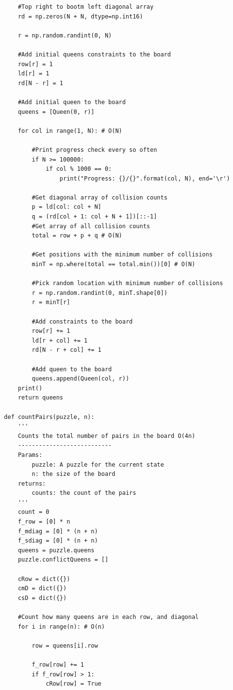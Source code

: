 \documentclass{article}
\begin{document}
\begin{verbatim}   
      #Top right to bootm left diagonal array
      rd = np.zeros(N + N, dtype=np.int16)

      r = np.random.randint(0, N)
   
      #Add initial queens constraints to the board
      row[r] = 1
      ld[r] = 1
      rd[N - r] = 1
  
      #Add initial queen to the board
      queens = [Queen(0, r)]
  
      for col in range(1, N): # O(N)
  
          #Print progress check every so often
          if N >= 100000:
              if col % 1000 == 0:
                  print("Progress: {}/{}".format(col, N), end='\r') 
  
          #Get diagonal array of collision counts
          p = ld[col: col + N]
          q = (rd[col + 1: col + N + 1])[::-1]
          #Get array of all collision counts
          total = row + p + q # O(N)
  
          #Get positions with the minimum number of collisions
          minT = np.where(total == total.min())[0] # O(N)
  
          #Pick random location with minimum number of collisions
          r = np.random.randint(0, minT.shape[0])
          r = minT[r]
  
          #Add constraints to the board
          row[r] += 1
          ld[r + col] += 1
          rd[N - r + col] += 1
  
          #Add queen to the board
          queens.append(Queen(col, r))
      print()
      return queens
  
  def countPairs(puzzle, n):
      '''
      Counts the total number of pairs in the board O(4n)
      ---------------------------
      Params:
          puzzle: A puzzle for the current state
          n: the size of the board
      returns:
          counts: the count of the pairs
      '''
      count = 0
      f_row = [0] * n
      f_mdiag = [0] * (n + n)
      f_sdiag = [0] * (n + n)
      queens = puzzle.queens
      puzzle.conflictQueens = []
  
      cRow = dict({})
      cmD = dict({})
      csD = dict({})
  
      #Count how many queens are in each row, and diagonal
      for i in range(n): # O(n)
  
          row = queens[i].row
  
          f_row[row] += 1
          if f_row[row] > 1:
              cRow[row] = True
  

\end{verbatim}
\end{document}

